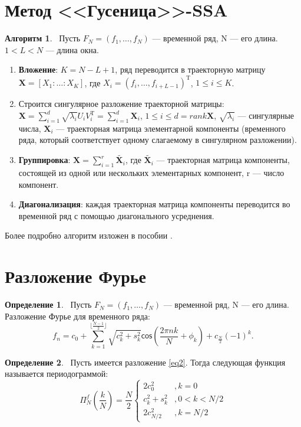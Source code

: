 \documentclass[specialist,
               substylefile = spbu_report.rtx,
               subf,href,colorlinks=true, 12pt]{disser}
\theoremstyle{definition}
\newtheorem{definition}{Определение}
\newtheorem{algorithm}{Алгоритм}
\begin{document}
\section{Метод <<Гусеница>>-SSA}
\begin{algorithm}
    ~Пусть $F_N=(f_1, \ldots, f_N)$ --- временной ряд, N --- его длина. $1<L<N$ --- длина окна.
    \begin{enumerate}
	    \item \textbf{Вложение}: $K=N-L+1$, ряд переводится в траекторную матрицу $\bm{X}=[X_1:\ldots:X_K]$, где $X_i = (f_i, \ldots, f_{i + L - 1})^{\mathrm{T}}$, $1 \leq i \leq K$.

	    \item Строится сингулярное разложение траекторной матрицы: $\bm{X} = \sum\limits_{i=1}^d \sqrt{\lambda_i}U_iV_i^{\mathrm{T}} = \sum\limits_{i=1}^d\bm{X}_i$, $1 \leq i \leq d = rank\bm{X}$, $\sqrt{\lambda_i}$ --- сингулярные числа, $\bm{X}_i$ --- траекторная матрица элементарной компоненты (временного ряда, который соответствует одному слагаемому в сингулярном разложении).

	    \item \textbf{Группировка}: $\bm{X} =  \sum\limits_{i=1}^r \widetilde{\bm{X}_i}$, где $\widetilde{\bm{X}_i}$ --- траекторная матрица компоненты, состоящей из одной или нескольких элементарных компонент, r --- число компонент.

	    \item \textbf{Диагонализация}: каждая траекторная матрица компоненты переводится во временной ряд с помощью диагонального усреднения.
	\end{enumerate} 
	Более подробно алгоритм изложен в пособии \cite{Golyandina04}.
\end{algorithm}
\section{Разложение Фурье}
\begin{definition}
    ~Пусть $F_N=(f_1, \ldots, f_N)$ --- временной ряд, N --- его длина. Разложение Фурье для временного ряда:
    \begin{equation*} \label{eq2} \tag{2}
        f_n = c_0 + \sum\limits_{k = 1}^{\lfloor \frac{N - 1}{2}\rfloor} \sqrt{c_k^2 + s_k^2}\mathsf{cos}(\frac{2\pi nk}{N} + \phi_k) + c_{\frac{N}{2}}(-1)^k.
    \end{equation*}
\end{definition}
\begin{definition}
    ~Пусть имеется разложение \eqref{eq2}. Тогда следующая функция называется периодограммой:
    \begin{equation*}
                \Pi^f_N (\frac{k}{N}) = \frac{N}{2}
        \begin{cases}
        2c_0^2 & ,k = 0\\
        c_k^2+s_k^2 & ,0 < k < N/2\\
        2c^2_{N/2} & ,k = N/2
        \end{cases}
    \end{equation*}
\end{definition}
    
\end{document}
